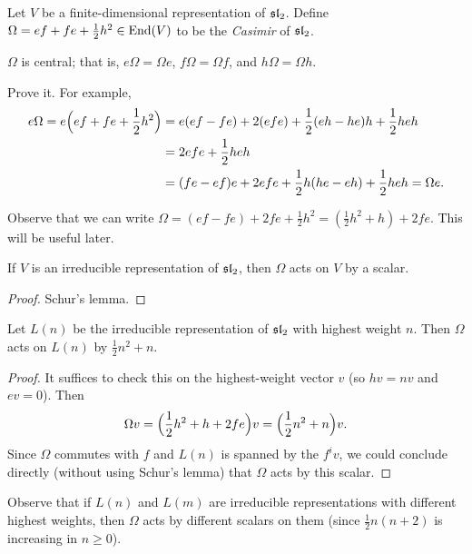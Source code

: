 \begin{definition}
Let $V$ be a finite-dimensional representation of $\sl_2$. Define
$\Omega = ef + fe + \frac12 h^2 \in \End(V)$ to be the \emph{Casimir} of
$\sl_2$.
\end{definition}

\begin{lemma}
$\Omega$ is central; that is, $e\Omega = \Omega e$, $f\Omega = \Omega f$, and
$h\Omega = \Omega h$.
\end{lemma}

\begin{exercise}
Prove it. For example,
\begin{align*}
  e\Omega = e\Bigl(ef + fe + \frac12 h^2\Bigr)
    &= e(ef - fe) + 2(efe) + \frac12(eh - he)h + \frac12 heh\\
    &= 2efe + \frac12 heh\\
    &= (fe - ef)e + 2efe + \frac12 h(he - eh) + \frac12 heh = \Omega e.
\end{align*}
\end{exercise}

Observe that we can write
$\Omega = (ef - fe) + 2fe + \frac12 h^2 = (\frac12 h^2 + h) + 2fe$. This will
be useful later.

\begin{corollary}
If $V$ is an irreducible representation of $\sl_2$, then $\Omega$ acts on $V$
by a scalar.
\end{corollary}

\begin{proof}
Schur's lemma.
\end{proof}

\begin{lemma}
Let $L(n)$ be the irreducible representation of $\sl_2$ with highest weight
$n$. Then $\Omega$ acts on $L(n)$ by $\frac12 n^2 + n$.
\end{lemma}

\begin{proof}
It suffices to check this on the highest-weight vector $v$ (so $hv = nv$ and
$ev = 0$). Then
\[
  \Omega v = \Bigl(\frac12 h^2 + h + 2fe\Bigr)v = \Bigl(\frac12 n^2 + n\Bigr)v.
\]
Since $\Omega$ commutes with $f$ and $L(n)$ is spanned by the $f^iv$, we could
conclude directly (without using Schur's lemma) that $\Omega$ acts by this
scalar.
\end{proof}

Observe that if $L(n)$ and $L(m)$ are irreducible representations with
different highest weights, then $\Omega$ acts by different scalars on them
(since $\frac12 n(n + 2)$ is increasing in $n \geq 0$).

